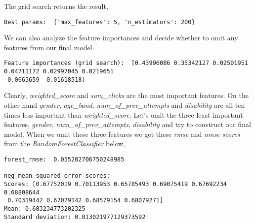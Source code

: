 \documentclass[8pt]{article}
\begin{document}
\newline
\newline
The grid search returns the result,
\newline
\newline
\begin{adjustbox}{max width=\textwidth}
\begin{lstlisting}
Best params:  {'max_features': 5, 'n_estimators': 200}
\end{lstlisting}
\end{adjustbox}
\newline
\newline
We can also analyze the feature importances and decide whether to omit any features from our final model.
\newline
\newline
\begin{adjustbox}{max width=\textwidth}
\begin{lstlisting}
Feature importances (grid search):  [0.43996086 0.35342127 0.02501951 0.04711172 0.02997045 0.0219651
 0.0663659  0.01618518]
\end{lstlisting}
\end{adjustbox}
\newline
\newline
Clearly, \textit{weighted\_score} and \textit{sum\_clicks} are the most important features. On the other hand \textit{gender}, \textit{age\_band}, \textit{num\_of\_prev\_attempts} and \textit{disability} are all ten times less important than \textit{weighted\_score}. Let's omit the three least important features, \textit{gender}, \textit{num\_of\_prev\_attempts}, \textit{disability} and try to construct our final model. When we omit these three features we get these \textit{rmse} and \textit{nmse scores} from the \textit{RandomForestClassifier} below,
\newline
\newline
\begin{adjustbox}{max width=\textwidth}
\begin{lstlisting}
forest_rmse:  0.055202706750248985

neg_mean_squared_error scores:
Scores: [0.67752019 0.70113953 0.65785493 0.69075419 0.67692234 0.68808644
 0.70319442 0.67029142 0.68579154 0.68079271]
Mean: 0.683234773202325
Standard deviation: 0.013021977129373592
\end{lstlisting}
\end{adjustbox}
\newline
\newline
\end{document}
